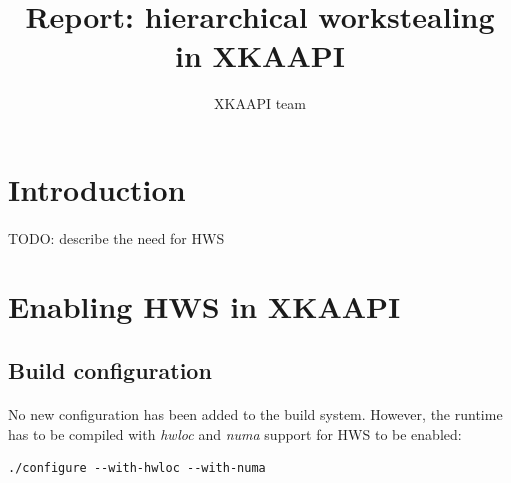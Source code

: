 \documentclass[a4paper, 11pt]{article}
\begin{document}
\title{Report: hierarchical workstealing in XKAAPI}
\author{XKAAPI team}
\date{}

\maketitle

\newpage
\tableofcontents
{}



%
\newpage
\section{Introduction}
\paragraph{}
TODO: describe the need for HWS


%
\newpage
\section{Enabling HWS in XKAAPI}

\subsection{Build configuration}
\paragraph{}
No new configuration has been added to the build system. However, the
runtime has to be compiled with \textit{hwloc} and \textit{numa} support
for HWS to be enabled:\\
\begin{small}
\begin{lstlisting}[frame=tb]
./configure --with-hwloc --with-numa
\end{lstlisting}
\end{small}
\end{document}
